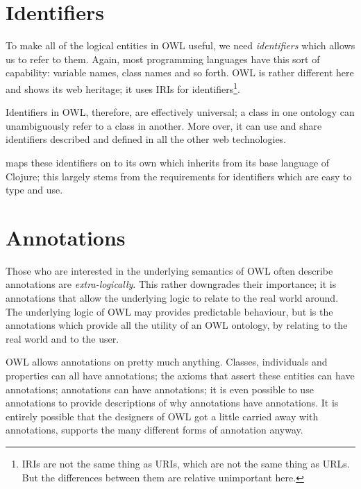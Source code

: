 \section{Identifiers}

To make all of the logical entities in OWL useful, we need
\emph{identifiers} which allows us to refer to them. Again, most
programming languages have this sort of capability: variable names,
class names and so forth. OWL is rather different here and shows its
web heritage; it uses IRIs for identifiers\footnote{IRIs are not the
  same thing as URIs, which are not the same thing as URLs. But the
  differences between them are relative unimportant here.}.

Identifiers in OWL, therefore, are effectively universal; a class in
one ontology can unambiguously refer to a class in another. More over,
it can use and share identifiers described and defined in all the
other web technologies.

\tawny maps these identifiers on to its own which inherits from its
base language of Clojure; this largely stems from the requirements for
identifiers which are easy to type and use.


\section{Annotations}

Those who are interested in the underlying semantics of OWL often
describe annotations are \emph{extra-logically}. This rather
downgrades their importance; it is annotations that allow the
underlying logic to relate to the real world around. The underlying
logic of OWL may provides predictable behaviour, but is the
annotations which provide all the utility of an OWL ontology, by
relating to the real world and to the user.

OWL allows annotations on pretty much anything. Classes, individuals
and properties can all have annotations; the axioms that assert these
entities can have annotations; annotations can have annotations; it is
even possible to use annotations to provide descriptions of why
annotations have annotations. It is entirely possible that the
designers of OWL got a little carried away with annotations, \tawny
supports the many different forms of annotation anyway.
